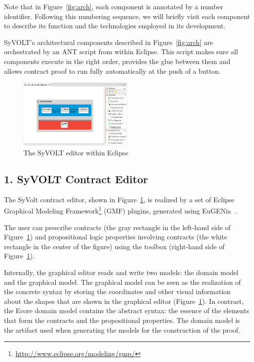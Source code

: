Note that in Figure~\ref{fig:arch}, each component is annotated by a number
identifier. Following this numbering sequence, we will briefly visit each
component to describe its function and the technologies employed in its development.

SyVOLT's architectural components described in Figure~\ref{fig:arch} are
orchestrated by an ANT script from within Eclipse. This script makes sure all components execute in the
right order, provides the glue between them and allows contract proof to run
fully automatically at the push of a button.

\begin{figure}
\centering
\includegraphics[width=0.5\textwidth]{figures/eclipse_frontend}
\caption{The SyVOLT editor within Eclipse}
\label{fig:eclipse_frontend}
\end{figure}


\subsection*{1. SyVOLT Contract Editor}

The SyVolt contract editor, shown in Figure~\ref{fig:eclipse_frontend}, is
realized by a set of Eclipse Graphical Modeling Framework\footnote{\url{http://www.eclipse.org/modeling/gmp/}} (GMF) plugins, generated using
EuGENia~\cite{Kolovos2010a}.

The user can prescribe contracts (the gray rectangle in the left-hand side of
Figure~\ref{fig:eclipse_frontend}) and propositional logic properties involving
contracts (the white rectangle in the center of the figure) using the toolbox (right-hand side of Figure~\ref{fig:eclipse_frontend}).

Internally, the graphical editor reads and write two models: the domain model and the graphical model.
The graphical model can be seen as the realization of the concrete syntax by storing the coordinates and other visual information about the shapes that are shown in the graphical editor (Figure~\ref{fig:eclipse_frontend}). 
In contrast, the Ecore domain model contains the abstract syntax: the essence of
the elements that form the contracts and the propositional properties.
The domain model is the artifact used when generating the models for the construction of the proof.


